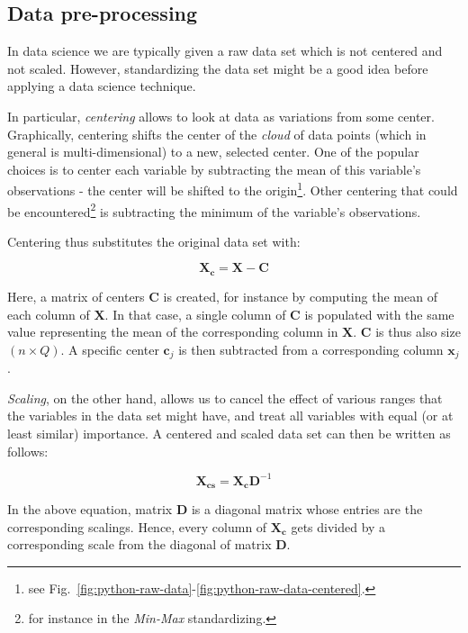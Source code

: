 \documentclass[10pt,twocolumn]{article}
\begin{document}
\subsection{Data pre-processing}

In data science we are typically given a raw data set which is not centered and not scaled. However, standardizing the data set might be a good idea before applying a data science technique.

In particular, \textit{centering} allows to look at data as variations from some center. Graphically, centering shifts the center of the \textit{cloud} of data points (which in general is multi-dimensional) to a new, selected center. One of the popular choices is to center each variable by subtracting the mean of this variable's observations - the center will be shifted to the origin\footnote{see Fig.~\ref{fig:python-raw-data}-\ref{fig:python-raw-data-centered}.}.
Other centering that could be encountered\footnote{for instance in the \textit{Min-Max} standardizing.} is subtracting the minimum of the variable's observations.

Centering thus substitutes the original data set with:

\begin{equation}
\mathbf{X_c} = \mathbf{X} - \mathbf{C}
\end{equation}

Here, a matrix of centers $\mathbf{C}$ is created, for instance by computing the mean of each column of $\mathbf{X}$. In that case, a single column of $\mathbf{C}$ is populated with the same value representing the mean of the corresponding column in $\mathbf{X}$. $\mathbf{C}$ is thus also size $(n \times Q)$. A specific center $\mathbf{c}_j$ is then subtracted from a corresponding column $\mathbf{x}_j$.

\textit{Scaling}, on the other hand, allows us to cancel the effect of various ranges that the variables in the data set might have, and treat all variables with equal (or at least similar) importance. A centered and scaled data set can then be written as follows:

\begin{equation}
\mathbf{X_{cs}} = \mathbf{X_c}\mathbf{D}^{-1}
\end{equation}

In the above equation, matrix $\mathbf{D}$ is a diagonal matrix whose entries are the corresponding scalings. Hence, every column of $\mathbf{X_c}$ gets divided by a corresponding scale from the diagonal of matrix $\mathbf{D}$.
\end{document}
